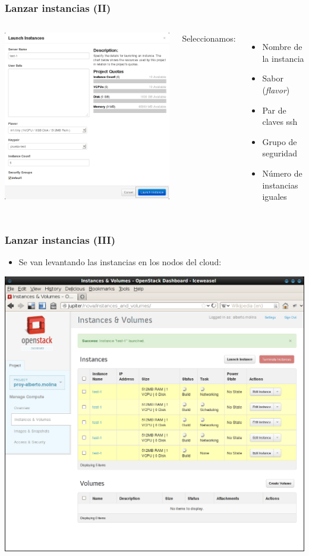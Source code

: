\documentclass{beamer}
\begin{document}
\begin{frame}
  \frametitle{Lanzar instancias (II)}
  \begin{columns}
    \begin{center}
      \includegraphics[width=.8\columnwidth]{../img/horizon6.png}      
    \end{center}
    Seleccionamos:
    \begin{itemize}
    \item Nombre de la instancia
    \item Sabor (\textit{flavor})
    \item Par de claves ssh
    \item Grupo de seguridad
    \item Número de instancias iguales
    \end{itemize}
  \end{columns}
\end{frame}

\begin{frame}
  \frametitle{Lanzar instancias (III)}
  \begin{itemize}
  \item Se van levantando las instancias en los nodos del cloud:
  \end{itemize}
  \begin{center}
    \includegraphics[width=.6\textwidth]{../img/horizon7.png}    
  \end{center}
\end{frame}
\end{document}
